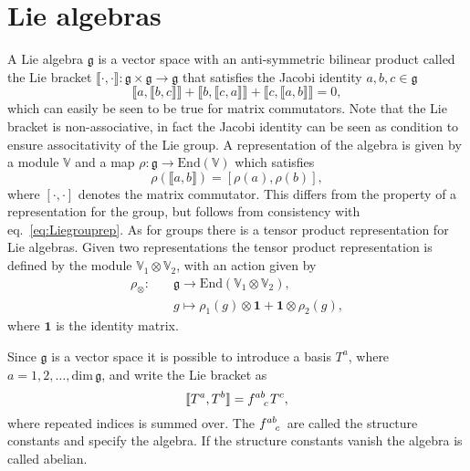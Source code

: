 \section{Lie algebras}\label{sec:Liealgebras}
A Lie algebra $\mathfrak{g}$ is a vector space with an anti-symmetric bilinear product called the Lie bracket $\llbracket\cdot,\cdot\rrbracket: \mathfrak{g}\times\mathfrak{g}\to\mathfrak{g}$ that satisfies the Jacobi identity $a,b,c\in\mathfrak{g}$
\begin{equation}
\llbracket a,\llbracket b,c\rrbracket\rrbracket+\llbracket b,\llbracket c,a\rrbracket\rrbracket+\llbracket c,\llbracket a,b\rrbracket\rrbracket=0, 
\end{equation}
which can easily be seen to be true for matrix commutators. Note that the Lie bracket is non-associative, in fact the Jacobi identity can be seen as condition to ensure associtativity of the Lie group. A representation of the algebra is given by a module $\mathbb{V}$ and a map $\rho: \mathfrak{g}\to \text{End}(\mathbb{V})$ which satisfies
\begin{equation}\label{eq:lierep}
    \rho(\llbracket a,b\rrbracket) = [\rho(a),\rho(b)],
\end{equation}
where $[\cdot,\cdot]$ denotes the matrix commutator. This differs from the property of a representation for the group, but follows from consistency with eq.\ \eqref{eq:Liegrouprep}. As for groups there is a tensor product representation for Lie algebras. Given two representations the tensor product representation is defined by the module $\mathbb{V}_1\otimes\mathbb{V}_2$, with an action given by 
\begin{equation}
    \begin{aligned}
        \rho_\otimes:\quad &\mathfrak{g}\to\text{End}\left(\mathbb{V}_1\otimes\mathbb{V}_2\right), \\
                & g\mapsto \rho_1(g)\otimes \mathbf{1}+\mathbf{1}\otimes\rho_2(g),
    \end{aligned}
\end{equation}
where $\mathbf{1}$ is the identity matrix.


Since $\mathfrak{g}$ is a vector space it is possible to introduce a basis $T^a$, where $a=1,2,\ldots,\text{dim}\,\mathfrak{g}$, and write the Lie bracket as 
\begin{equation}
    \llbracket T^a,T^b\rrbracket = \tensor{f}{^{ab}_c} T^c,
\end{equation}
where repeated indices is summed over. The $\tensor{f}{^{ab}_c}$ are called the structure constants and specify the algebra. If the structure constants vanish the algebra is called abelian.

